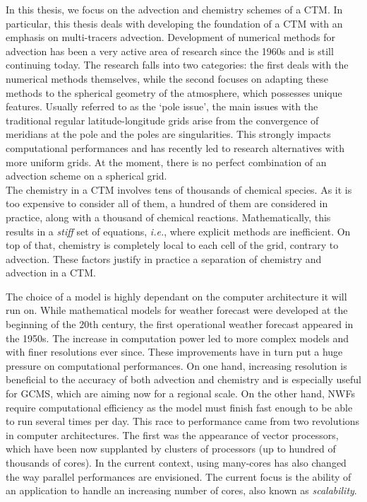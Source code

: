 In this thesis, we focus on the advection and chemistry schemes of a CTM\@. In
particular, this thesis deals with developing the foundation of a CTM with an
emphasis on multi-tracers advection.  Development of numerical methods for
advection has been a very active area of research since the 1960s and is still
continuing today. The research falls into two categories: the first deals with
the numerical methods themselves, while the second focuses on adapting these
methods to the spherical geometry of the atmosphere, which possesses unique
features. Usually referred to as the `pole issue', the main issues with the
traditional regular latitude-longitude grids arise from the convergence of
meridians at the pole and the poles are singularities. This strongly impacts
computational performances and has recently led to research alternatives with
more uniform grids. At the moment, there is no perfect combination of an
advection scheme on a spherical grid.\\ The chemistry in a CTM involves tens of
thousands of chemical species. As it is too expensive to consider all of them, a
hundred of them are considered in practice, along with a thousand of chemical
reactions. Mathematically, this results in a \textit{stiff} set of equations,
\textit{i.e.}, where explicit methods are inefficient. On top of that, chemistry
is completely local to each cell of the grid, contrary to advection. These
factors justify in practice a separation of chemistry and advection in a CTM\@.

The choice of a model is highly dependant on the computer architecture it will
run on. While mathematical models for weather forecast were developed at the
beginning of the 20th century, the first operational weather forecast appeared
in the 1950s. The increase in computation power led to more complex models and
with finer resolutions ever since. These improvements have in turn put a huge
pressure on computational performances. On one hand, increasing resolution is
beneficial to the accuracy of both advection and chemistry and is especially
useful for GCMS, which are aiming now for a regional scale. On the other hand,
NWFs require computational efficiency as the model must finish fast enough to be
able to run several times per day. This race to performance came from two
revolutions in computer architectures. The first was the appearance of vector
processors, which have been now supplanted by clusters of processors (up to
hundred of thousands of cores). In the current context, using many-cores has
also changed the way parallel performances are envisioned. The current focus is
the ability of an application to handle an increasing number of cores, also
known as \textit{scalability}.

